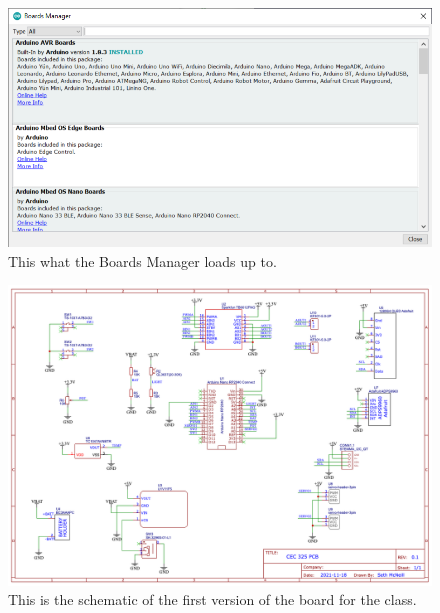 \begin{figure}[!htb]
	\centering
	\includegraphics[scale=0.9]{arduinoStart/BoardsManager.PNG}
	\caption{This what the Boards Manager loads up to.}
	\label{fig:boardsManager}
\end{figure} 

\begin{figure}[!htb]
	\centering
	\includegraphics[width=\textwidth]{arduinoStart/Schematic_NanoConnectRP2040test1_v0.1} %
	\caption{This is the schematic of the first version of the board for the class.}
	\label{fig:boardSchematic}
\end{figure} 


